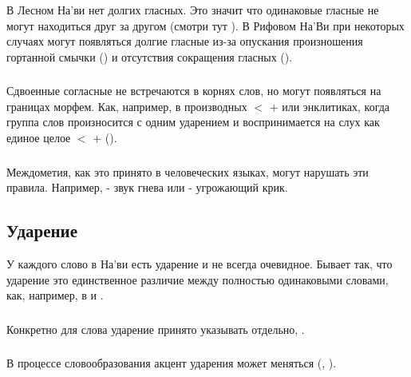 \subsubsection{} В Лесном На'ви нет долгих гласных. Это значит что одинаковые гласные не могут находиться друг за другом (смотри тут
).  В Рифовом На'Ви при некоторых случаях могут появляться долгие гласные из-за опускания произношения гортанной смычки  () и отсутствия сокращения гласных
(). 

\subsubsection{} Сдвоенные согласные не встречаются в корнях слов, но могут появляться на границах морфем. Как, например, в производных
 $<$  $+$  или энклитиках, 
когда группа слов произносится с одним ударением и воспринимается на слух как единое целое 
 $<$  $+$  ().

\subsubsection{} Междометия, как это принято в человеческих языках, могут нарушать эти правила. Например,  - звук гнева или 
 - угрожающий крик.


\subsection{Ударение}
У каждого слово в На'ви есть ударение и не всегда очевидное.  Бывает так, что ударение это единственное различие между полностью одинаковыми словами, как, например, в  
и  .

\subsubsection{} Конкретно для слова  ударение принято указывать отдельно, .

\subsubsection{} В процессе словообразования акцент ударения может меняться
(, ).

